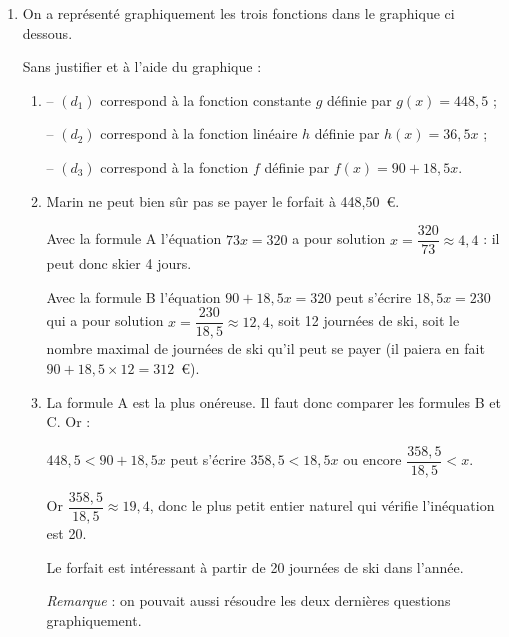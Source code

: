 \begin{enumerate}
\begin{enumerate}
Formule C : fonction $g$.	
		\item %
		Il faut donc résoudre l'équation : $h(x) = f(x)$, soit $36,5x = 90 + 18,5x$ d'où en ajoutant $- 18,5x$ à chaque membre : $18x = 90$ ou $2 \times 9 x = 9 \times 2 \times 5$ et en simplifiant par $2 \times 9$ ; \, $x = 5$.
		
On a effectivement : $h(5) = 182,5$ et $f(5) = 90 + 18,5 \times 5 = 90 + 92,5 = 182,5$.

On paiera avec les formules A et B, 182,50~\euro.
	\end{enumerate}

	\item On a représenté graphiquement les trois fonctions dans le graphique ci dessous.
	
	Sans justifier et à l'aide du graphique :
	
	\begin{enumerate}
		\item %
-- $\left(d_1\right)$ correspond à la fonction constante $g$ définie par $g(x) = 448,5$ ;

-- $\left(d_2\right)$ correspond à la fonction linéaire $h$ définie par $h(x) = 36,5x$ ;

-- $\left(d_3\right)$ correspond à la fonction  $f$ définie par $f(x) = 90 + 18,5x$.
		
		\item %
Marin ne peut bien sûr pas se payer le forfait à 448,50~\euro.

Avec la formule A l'équation $73x = 320$ a pour solution $x = \dfrac{320}{73} \approx 4,4$ : il peut donc skier 4 jours.

Avec la formule B l'équation $90 + 18,5x = 320$ peut s'écrire $18,5x = 230$ qui a pour solution $x  = \dfrac{230}{18,5} \approx 12,4$, soit 12 journées de ski, soit le nombre maximal de journées de ski qu'il peut se payer (il paiera en fait $90 + 18,5 \times 12 = 312$~\euro).
		
		\item %
La formule A est la plus onéreuse. Il faut donc comparer les formules B et C. Or :
		
$448,5 < 90 + 18,5x$ peut s'écrire $358,5 < 18,5x$ ou encore $\dfrac{358,5}{18,5} < x$.
		
Or $\dfrac{358,5}{18,5} \approx 19,4$, donc le plus petit entier naturel qui vérifie l'inéquation est 20.
		
Le forfait est intéressant à partir de 20 journées de ski dans l'année.

\emph{Remarque} : on pouvait aussi résoudre les deux dernières questions graphiquement.
	\end{enumerate}
\end{enumerate}

